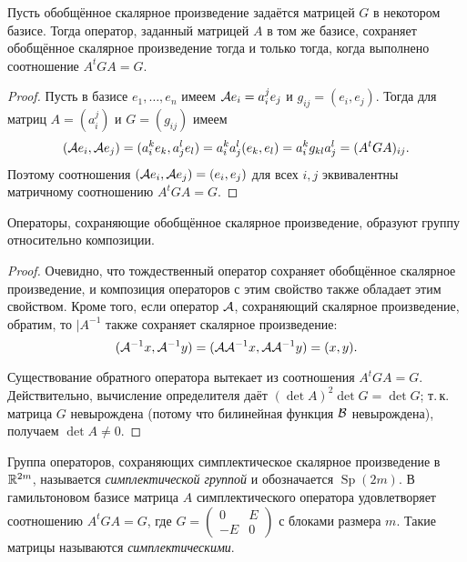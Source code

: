 \begin{proposal}
    Пусть обобщённое скалярное произведение задаётся матрицей $G$ в некотором базисе. Тогда оператор, заданный матрицей $A$ в том же базисе, сохраняет обобщённое скалярное произведение тогда и только тогда, когда выполнено соотношение $A^tGA = G$.
\end{proposal}

\begin{proof}
    Пусть в базисе $e_1, \ldots, e_n$ имеем $\mathcal{A} e_i = a^j_ie_j$ и $g_{ij} = (e_i, e_j)$. Тогда для матриц $A = (a^j_i)$ и $G = (g_{ij})$ имеем
    \[
        (\mathcal{A} e_i, \mathcal{A} e_j) = (a^k_ie_k, a^l_je_l) = a^k_ia^l_j(e_k, e_l) = a^k_ig_{kl}a^l_j = (A^tGA)_{ij}.
    \]
    Поэтому соотношения $(\mathcal{A} e_i, \mathcal{A} e_j) = (e_i, e_j)$ для всех $i, j$ эквивалентны матричному соотношению $A^tGA = G$.
\end{proof}

\begin{proposal}
    Операторы, сохраняющие обобщённое скалярное произведение, образуют группу относительно композиции.
\end{proposal}

\begin{proof}
    Очевидно, что тождественный оператор сохраняет обобщённое скалярное произведение, и композиция операторов с этим свойство также обладает этим свойством. Кроме того, если оператор $\mathcal{A}$, сохраняющий скалярное произведение, обратим, то $|A^{-1}$ также сохраняет скалярное произведение:
    \[
        (\mathcal{A}^{-1}x, \mathcal{A}^{-1}y) = (\mathcal{A}\mathcal{A}^{-1}x, \mathcal{A}\mathcal{A}^{-1}y) = (x, y).
    \]

    Существование обратного оператора вытекает из соотношения $A^tGA = G$. Действительно, вычисление определителя даёт $(\det A)^2\det G = \det G$; т.\,к. матрица $G$ невырождена (потому что билинейная функция $\mathcal{B}$ невырождена), получаем $\det A \ne 0$.
\end{proof}

\begin{definition}
    Группа операторов, сохраняющих симплектическое скалярное произведение в $\mathbb{R}^{2m}$, называется \textit{симплектической группой} и обозначается $\operatorname{Sp}(2m)$. В гамильтоновом базисе матрица $A$ симплектического оператора удовлетворяет соотношению $A^tGA = G$, где
    $
    G =
    \begin{pmatrix}
        0 & E\\
        -E & 0
    \end{pmatrix}
    $ с блоками размера $m$. Такие матрицы называются \textit{симплектическими}.
\end{definition}

